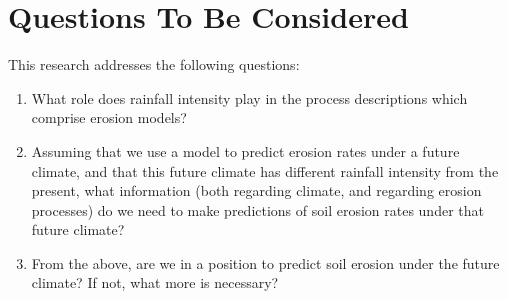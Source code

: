 
\section{Questions To Be Considered}
\label{sec:ResearchQuestions}
This research addresses the following questions:
\begin{enumerate}[{Question} 1.]
  \item What role does rainfall intensity play in the process descriptions which
comprise erosion models?\label{researchquestion1}
  \item Assuming that we use a model to predict erosion rates under a future
climate, and that this future climate has different rainfall intensity from the
present, what information (both regarding climate, and regarding erosion
processes) do we need to make predictions of soil erosion rates under that
future climate? \label{researchquestion2}
  \item From the above, are we in a position to predict soil erosion under the
future climate? If not, what more is necessary?\label{researchquestion3}
\end{enumerate}

